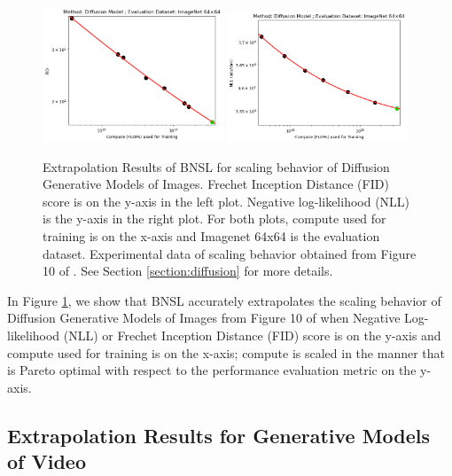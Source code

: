 \documentclass{article} %
\begin{document}
\begin{figure}[htbp]
    \centering
\includegraphics[width=0.48\textwidth]{figures/diffusion/diffusion__fid.png}
\includegraphics[width=0.48\textwidth]{figures/diffusion/diffusion__nll.png}

    \caption{
Extrapolation Results of BNSL for scaling behavior of Diffusion Generative Models of Images. Frechet Inception Distance (FID) score is on the y-axis in the left plot. Negative log-likelihood (NLL) is the y-axis in the right plot. For both plots, compute used for training is on the x-axis and Imagenet 64x64 is the evaluation dataset. Experimental data of scaling behavior obtained from Figure 10 of \cite{nichol2021improved}. See Section \ref{section:diffusion} for more details.
    }
    \label{fig:diffusion_compute_scaling}
\end{figure}

In Figure \ref{fig:diffusion_compute_scaling}, we show that BNSL accurately extrapolates the scaling behavior of Diffusion Generative Models of Images from Figure 10 of \cite{nichol2021improved} when Negative Log-likelihood (NLL) or Frechet Inception Distance (FID) score is on the y-axis and compute used for training is on the x-axis; compute is scaled in the manner that is Pareto optimal with respect to the performance evaluation metric on the y-axis.

\FloatBarrier

\subsection{Extrapolation Results for Generative Models of Video}
\label{section:video}
\end{document}
